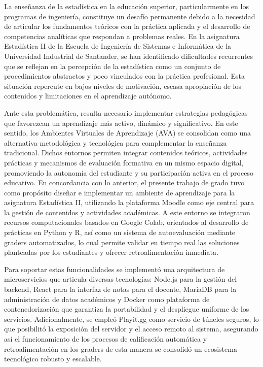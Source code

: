 \documentclass[letter,oneside,12pt,spanish]{report}
\begin{document}

\newpage


La enseñanza de la estadística en la educación superior, particularmente en los programas de ingeniería, constituye un desafío permanente debido a la necesidad de articular los fundamentos teóricos con la práctica aplicada y el desarrollo de competencias analíticas que respondan a problemas reales. En la asignatura Estadística II de la Escuela de Ingeniería de Sistemas e Informática de la Universidad Industrial de Santander, se han identificado dificultades recurrentes que se reflejan en la percepción de la estadística como un conjunto de procedimientos abstractos y poco vinculados con la práctica profesional. Esta situación repercute en bajos niveles de motivación, escasa apropiación de los contenidos y limitaciones en el aprendizaje autónomo.

Ante esta problemática, resulta necesario implementar estrategias pedagógicas que favorezcan un aprendizaje más activo, dinámico y significativo. En este sentido, los Ambientes Virtuales de Aprendizaje (AVA) se consolidan como una alternativa metodológica y tecnológica para complementar la enseñanza tradicional. Dichos entornos permiten integrar contenidos teóricos, actividades prácticas y mecanismos de evaluación formativa en un mismo espacio digital, promoviendo la autonomía del estudiante y su participación activa en el proceso educativo.
En concordancia con lo anterior, el presente trabajo de grado tuvo como propósito diseñar e implementar un ambiente de aprendizaje para la asignatura Estadística II, utilizando la plataforma Moodle como eje central para la gestión de contenidos y actividades académicas. A este entorno se integraron recursos computacionales basados en Google Colab, orientados al desarrollo de prácticas en Python y R, así como un sistema de autoevaluación mediante graders automatizados, lo cual permite validar en tiempo real las soluciones planteadas por los estudiantes y ofrecer retroalimentación inmediata.

Para soportar estas funcionalidades se implementó una arquitectura de microservicios que articula diversas tecnologías: Node.js para la gestión del backend, React para la interfaz de notas para el docente, MariaDB para la administración de datos académicos y Docker como plataforma de contenedorización que garantiza la portabilidad y el despliegue uniforme de los servicios. Adicionalmente, se empleó Playit.gg como servicio de túneles seguros, lo que posibilitó la exposición del servidor y el acceso remoto al sistema, asegurando así el funcionamiento de los procesos de calificación automática y retroalimentación en los graders de esta manera se consolidó un ecosistema tecnológico robusto y escalable.
\end{document}
